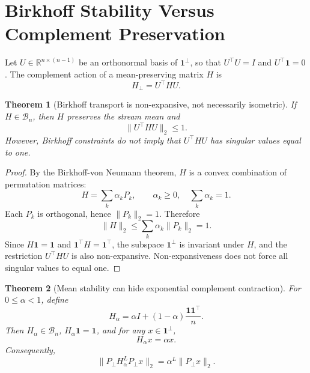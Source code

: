 \documentclass[10pt]{article}
\newtheorem{theorem}{Theorem}
\newcommand{\one}{\mathbf{1}}
\newcommand{\R}{\mathbb{R}}
\newcommand{\Birk}{\mathcal{B}_n}
\newcommand{\pperp}{P_{\perp}}
\newcommand{\operp}{\one^{\perp}}
\begin{document}
\section{Birkhoff Stability Versus Complement Preservation}

Let $U\in\R^{n\times(n-1)}$ be an orthonormal basis of $\operp$, so that
$U^\top U=I$ and $U^\top\one=0$.  The complement action of a mean-preserving
matrix $H$ is
\begin{equation}
    H_\perp = U^\top H U.
\end{equation}

\begin{theorem}[Birkhoff transport is non-expansive, not necessarily isometric]
\label{thm:birkhoff-nonexpansive}
If $H\in\Birk$, then $H$ preserves the stream mean and
\begin{equation}
    \|U^\top H U\|_2 \le 1.
\end{equation}
However, Birkhoff constraints do not imply that $U^\top H U$ has singular
values equal to one.
\end{theorem}

\begin{proof}
By the Birkhoff-von Neumann theorem, $H$ is a convex combination of permutation
matrices:
\begin{equation}
    H=\sum_k \alpha_k P_k,\qquad \alpha_k\ge 0,\quad \sum_k\alpha_k=1.
\end{equation}
Each $P_k$ is orthogonal, hence $\|P_k\|_2=1$.  Therefore
\begin{equation}
    \|H\|_2 \le \sum_k\alpha_k\|P_k\|_2 = 1.
\end{equation}
Since $H\one=\one$ and $\one^\top H=\one^\top$, the subspace $\operp$ is
invariant under $H$, and the restriction $U^\top H U$ is also non-expansive.
Non-expansiveness does not force all singular values to equal one.
\end{proof}

\begin{theorem}[Mean stability can hide exponential complement contraction]
\label{thm:halpha}
For $0\le \alpha<1$, define
\begin{equation}
    H_\alpha = \alpha I + (1-\alpha)\frac{\one\one^\top}{n}.
\end{equation}
Then $H_\alpha\in\Birk$, $H_\alpha\one=\one$, and for any
$x\in\operp$,
\begin{equation}
    H_\alpha x = \alpha x.
\end{equation}
Consequently,
\begin{equation}
    \|\pperp H_\alpha^L\pperp x\|_2
    =
    \alpha^L \|\pperp x\|_2.
\end{equation}
\end{theorem}
\end{document}
